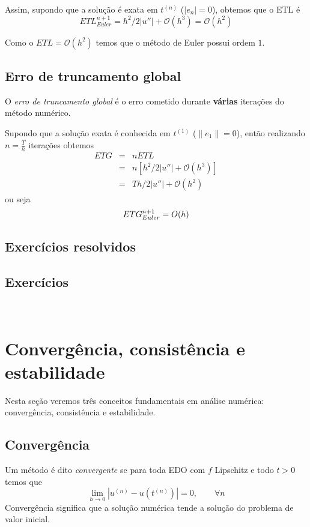 Assim, supondo que a solução é exata em $t^{(n)}$ ($|e_n|=0$), obtemos que o ETL é
\begin{equation} ETL_{Euler}^{n+1}= h^2/2|u''|+ \mathcal O(h^3) = \mathcal O(h^2) \end{equation}

Como o $ETL=\mathcal O(h^2)$ temos que o método de Euler possui ordem $1$.


\subsection{Erro de truncamento global}
O \emph{erro de truncamento global} é o erro cometido durante \textbf{várias} iterações do método numérico.

Supondo que a solução exata é conhecida em $t^{(1)}$ ($\|e_1\|=0$), então realizando $n=\frac{T}{h}$ iterações obtemos
\begin{eqnarray}
   ETG &=& nETL \\
       &=& n[h^2/2|u''|+ \mathcal O(h^3)] \\
       &=& Th/2|u''|+ \mathcal O(h^2)
\end{eqnarray}
ou seja
\begin{equation} ETG_{Euler}^{n+1} = \mathcal \mathcal{O}(h) \end{equation}

\subsection*{Exercícios resolvidos}

\emconstrucao

\subsection*{Exercícios}
\

\section{Convergência, consistência e estabilidade}
Nesta seção veremos três conceitos fundamentais em análise numérica: convergência, consistência e estabilidade.

\subsection{Convergência}
Um método é dito \emph{convergente} se para toda EDO com $f$ Lipschitz e todo $t>0$ temos que
\begin{equation}  \lim_{h \rightarrow 0} |u^{(n)} - u(t^{(n)})| =0, \quad \quad \forall n \end{equation}
Convergência significa que a solução numérica tende a solução do problema de valor inicial.


